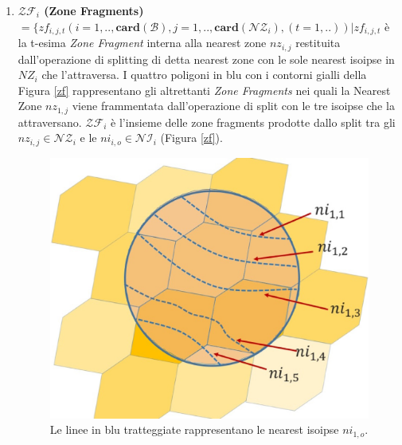 \begin{enumerate}
	\item \textbf{$\mathcal{ZF}_i$ (Zone Fragments)} $ = \{ zf_{i,j,t} (i=1,..,\mathbf{card}(\mathcal{B}),j=1,..,\mathbf{card}(\mathcal{NZ}_i),(t=1,..))| zf_{i,j,t}  $ è la t-esima \textit{Zone Fragment} interna alla nearest zone $nz_{i,j}$ restituita dall'operazione di splitting di detta nearest zone con le sole nearest isoipse in $NZ_{i}$ che l'attraversa.
	I quattro poligoni in blu con i contorni gialli della Figura \ref{zf} rappresentano gli altrettanti \textit{Zone Fragments} nei quali la Nearest Zone $nz_{1,j}$ viene frammentata dall'operazione di split con le tre isoipse che la attraversano. $\mathcal{ZF}_i$ è l'insieme delle zone fragments prodotte dallo split tra gli $nz_{i,j} \in \mathcal{NZ}_i $ e le $ni_{i,o} \in \mathcal{NI}_i$ (Figura \ref{zf}). 
	
	
	\begin{figure}[h]
		\hspace{0.1\linewidth}
		\begin{minipage}[t]{0.35\linewidth}
			\centering
			\includegraphics[width=1\textwidth]{images/ni}
			\caption{Le linee in blu tratteggiate rappresentano le nearest isoipse $ni_{1,o}$.}
			\label{NearestIso}
		\end{minipage}
		\hspace{0.1\linewidth}
		\begin{minipage}[t]{0.35\linewidth}
			\centering

\end{minipage}
\end{figure}
\end{enumerate}

